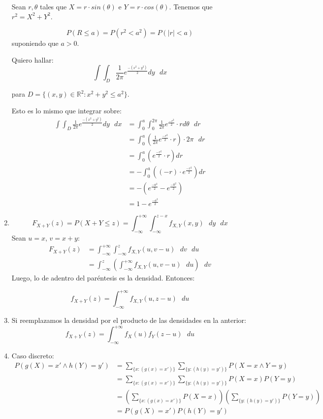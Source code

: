 \begin{enumerate}
		Sean $r, \theta$ tales que $X = r\cdot sin(\theta)$ e $Y = r \cdot cos(\theta)$.
		Tenemos que $r^2 = X^2 + Y^2$.
		
		$$P(R \leq a) = P(r^2 < a^2) = P(|r| < a)$$
		suponiendo que $a > 0$.
		
		Quiero hallar:
		$$\int\int_D \frac{1}{2\pi} e^{\frac{-(x^2 + y^2)}{2}} dy\text{ }dx$$
		
		para $D = \{(x, y) \in \mathbb{R}^2 : x^2 + y^2 \leq a^2\}$.		
		
		Esto es lo mismo que integrar sobre:
		\begin{align*}
			\int\int_D \frac{1}{2\pi} e^{\frac{-(x^2 + y^2)}{2}} dy\text{ }dx
				& = \int_0^a\int_0^{2\pi} \frac{1}{2\pi} e^{\frac{-r^2}{2}} \cdot r d\theta\text{ }dr\\
				& = \int_0^a \left(\frac{1}{2\pi} e^{\frac{-r^2}{2}} \cdot r\right) \cdot 2\pi\text{ }dr \\
				& = \int_0^a (e^{\frac{-r^2}{2}} \cdot r) dr \\
				& = -\int_0^a ((-r)\cdot e^{\frac{-r^2}{2}}) dr \\
				& = -(e^{\frac{-a^2}{2}} -e^{\frac{-0^2}{2}}) \\
				& = 1 - e^{\frac{-a^2}{2}}
		\end{align*}
	
	\item
		$$F_{X+Y}(z) = P(X+Y \leq z) = \int_{-\infty}^{+\infty} \int_{-\infty}^{z-x} f_{X,Y}(x, y)\text{ }dy\text{ }dx$$
		Sean $u=x$, $v=x+y$:
		\begin{align*}
			F_{X+Y}(z)	& = \int_{-\infty}^{+\infty} \int_{-\infty}^{z} f_{X,Y}(u, v-u)\text{ }dv\text{ }du \\
						& = \int_{-\infty}^{z} \left(\int_{-\infty}^{+\infty} f_{X,Y}(u, v-u)\text{ }du\right)\text{ }dv
		\end{align*}
		Luego, lo de adentro del paréntesis es la densidad. Entonces:
		
		$$f_{X+Y}(z) = \int_{-\infty}^{+\infty} f_{X,Y}(u, z-u)\text{ }du$$
		
	\item
		Si reemplazamos la densidad por el producto de las densidades en la anterior:
		$$f_{X+Y}(z) = \int_{-\infty}^{+\infty} f_{X}(u)f_Y(z-u)\text{ }du$$
		
	\item
		Caso discreto:
		\begin{align*}
			P(g(X) = x' \land h(Y) = y')	& = \sum_{\{x:(g(x) = x')\}} \sum_{\{y:(h(y) = y')\}} P(X = x \land Y = y)	\\
											& = \sum_{\{x:(g(x) = x')\}} \sum_{\{y:(h(y) = y')\}} P(X = x) P(Y = y)		\\
											& = \left(\sum_{\{x:(g(x) = x')\}} P(X = x)\right) \left(\sum_{\{y:(h(y) = y')\}} P(Y = y)\right) \\
											& = P(g(X) = x') P(h(Y) = y')
		\end{align*}
		

\end{enumerate}
